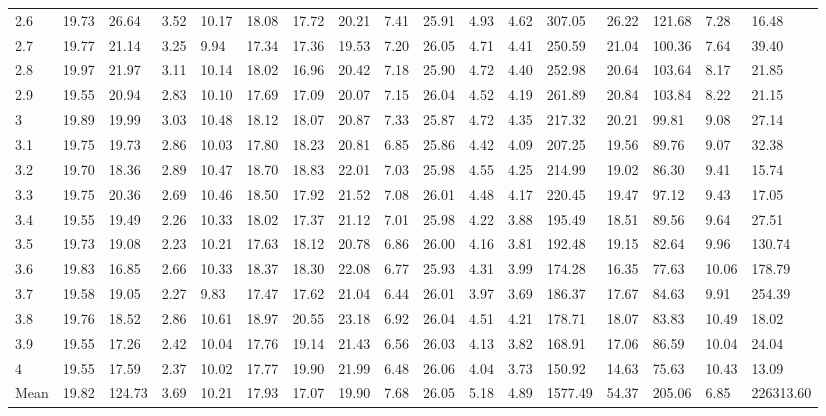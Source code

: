 \begin{adjustbox}{angle=90}
\begin{center}
\begin{tabular}{|l|llllllllllllllll|}
2.6&19.73&26.64&3.52&10.17&18.08&17.72&20.21&7.41&25.91&4.93&4.62&307.05&26.22&121.68&7.28&16.48  \\ 
2.7&19.77&21.14&3.25&9.94&17.34&17.36&19.53&7.20&26.05&4.71&4.41&250.59&21.04&100.36&7.64&39.40  \\ 
2.8&19.97&21.97&3.11&10.14&18.02&16.96&20.42&7.18&25.90&4.72&4.40&252.98&20.64&103.64&8.17&21.85  \\ 
2.9&19.55&20.94&2.83&10.10&17.69&17.09&20.07&7.15&26.04&4.52&4.19&261.89&20.84&103.84&8.22&21.15  \\ 
3&19.89&19.99&3.03&10.48&18.12&18.07&20.87&7.33&25.87&4.72&4.35&217.32&20.21&99.81&9.08&27.14  \\ 
3.1&19.75&19.73&2.86&10.03&17.80&18.23&20.81&6.85&25.86&4.42&4.09&207.25&19.56&89.76&9.07&32.38  \\ 
3.2&19.70&18.36&2.89&10.47&18.70&18.83&22.01&7.03&25.98&4.55&4.25&214.99&19.02&86.30&9.41&15.74  \\ 
3.3&19.75&20.36&2.69&10.46&18.50&17.92&21.52&7.08&26.01&4.48&4.17&220.45&19.47&97.12&9.43&17.05  \\ 
3.4&19.55&19.49&2.26&10.33&18.02&17.37&21.12&7.01&25.98&4.22&3.88&195.49&18.51&89.56&9.64&27.51  \\ 
3.5&19.73&19.08&2.23&10.21&17.63&18.12&20.78&6.86&26.00&4.16&3.81&192.48&19.15&82.64&9.96&130.74  \\ 
3.6&19.83&16.85&2.66&10.33&18.37&18.30&22.08&6.77&25.93&4.31&3.99&174.28&16.35&77.63&10.06&178.79  \\ 
3.7&19.58&19.05&2.27&9.83&17.47&17.62&21.04&6.44&26.01&3.97&3.69&186.37&17.67&84.63&9.91&254.39  \\ 
3.8&19.76&18.52&2.86&10.61&18.97&20.55&23.18&6.92&26.04&4.51&4.21&178.71&18.07&83.83&10.49&18.02  \\ 
3.9&19.55&17.26&2.42&10.04&17.76&19.14&21.43&6.56&26.03&4.13&3.82&168.91&17.06&86.59&10.04&24.04  \\ 
4&19.55&17.59&2.37&10.02&17.77&19.90&21.99&6.48&26.06&4.04&3.73&150.92&14.63&75.63&10.43&13.09  \\ \hline \hline
Mean&19.82&124.73&3.69&10.21&17.93&17.07&19.90&7.68&26.05&5.18&4.89&1577.49&54.37&205.06&6.85&226313.60  \\ \hline
\end{tabular}
\end{center}
\end{adjustbox}




